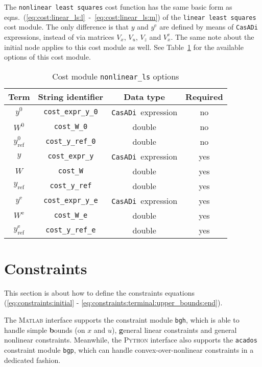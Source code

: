 \documentclass[english]{article}
\newcommand{\code}[1]{\texttt{#1}}
\newcommand{\casadi}{\texttt{CasADi}}
\newcommand{\acados}{\texttt{acados}}
\newcommand{\matlab}{\textsc{Matlab}}
\newcommand{\python}{\textsc{Python}}
\newcommand{\ind}[1]{_{\textrm{#1}}}
\newcommand{\terminal}{^{\textrm{e}}}
\newcommand{\initial}{^{\textrm{0}}}
\newcommand{\mandatory}{yes}
\newcommand{\optional}{no}
\begin{document}
The \code{nonlinear least squares} cost function has the same basic form as eqns.~(\ref{eq:cost:linear_ls:l}~-~\ref{eq:cost:linear_ls:m}) of the \code{linear least squares} cost module.
The only difference is that $ y $ and $ y\terminal $ are defined by means of \casadi{} expressions, instead of via matrices $ V_x $, $ V_u $, $ V_z $ and $ V_x\terminal $. The same note about the initial node applies to this cost module as well.
%
See Table~\ref{tab:cost:nonlinear_ls} for the available options of this cost module.
%
\begin{table}[ht!]
    \centering
    \caption{Cost module \code{nonlinear\_ls} options} \label{tab:cost:nonlinear_ls}
    \begin{tabular}{cccc}
        \toprule
        Term & String identifier & Data type & Required \\ \midrule
        $ y\initial $ & \code{cost\_expr\_y\_0}    & \casadi~expression  & \optional   \\
        $ W\initial $ & \code{cost\_W\_0}    & double  & \optional   \\
        $ y\ind{ref}\initial $ & \code{cost\_y\_ref\_0}    & double & \optional    \\ [1em]
        $ y $ & \code{cost\_expr\_y}    & \casadi~expression  & \mandatory   \\
        $ W $ & \code{cost\_W}    & double  & \mandatory   \\
        $ y\ind{ref} $ & \code{cost\_y\_ref}    & double & \mandatory    \\ [1em]
        $ y\terminal $ & \code{cost\_expr\_y\_e}    & \casadi~expression  & \mandatory   \\
        $ W\terminal $ & \code{cost\_W\_e}    & double & \mandatory   \\
        $ y\ind{ref}\terminal $ & \code{cost\_y\_ref\_e}    & double  & \mandatory   \\
        \bottomrule
    \end{tabular}
\end{table}
%
\section{Constraints}\label{sec:constraints}
%
This section is about how to define the constraints equations (\ref{eq:constraints:initial} - \ref{eq:constraints:terminal:upper_bounds:end}).

The \matlab{} interface supports the constraint module \code{bgh}, which is able to handle simple \textbf{b}ounds (on $ x $ and $ u $), \textbf{g}eneral linear constraints and general nonlinear constraints.
Meanwhile, the \python{} interface also supports the \acados{} constraint module \code{bgp}, which can handle convex-over-nonlinear constraints in a dedicated fashion.
\end{document}
